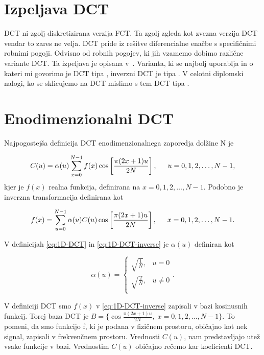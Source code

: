 \documentclass[a4paper,12pt,openright]{book}
\newcommand{\RNum}[1]{\uppercase\expandafter{\romannumeral #1\relax}}
\begin{document}
\section{Izpeljava DCT}
DCT ni zgolj diskretizirana verzija FCT. Ta zgolj zgleda kot zvezna verzija DCT vendar to zares ne velja. DCT pride iz rešitve diferencialne enačbe s specifičnimi robnimi pogoji. Odvisno od robnih pogojev, ki jih vzamemo dobimo različne variante DCT. Ta izpeljava je opisana v~\cite{britanak2010discrete}.  Varianta, ki se najbolj uporablja in o kateri mi govorimo je DCT tipa \RNum{2}, inverzni DCT je tipa \RNum{3}. V celotni diplomski nalogi, ko se sklicujemo na DCT mislimo s tem DCT tipa \RNum{2}. 

\section{Enodimenzionalni DCT}%
Najpogostejša definicija DCT enodimenzionalnega zaporedja dolžine N je %

\begin{equation}
C(u) = \alpha(u)  \sum_{x=0}^{N-1} f(x)\cos\left[\frac{\pi(2x+1)u}{2N}\right],  \indent 
u = 0,1,2,\ldots,N-1,
\label{eq:1D-DCT}
\end{equation}
kjer je $f(x)$ realna funkcija, definirana na $x = 0,1,2,\ldots,N-1$.
Podobno je inverzna transformacija definirana kot 

\begin{equation}
f(x) = \sum_{u=0}^{N-1} \alpha(u)C(u)\cos\left[\frac{\pi(2x+1)u}{2N}\right],  \indent 
x = 0,1,2,\ldots,N-1.
\label{eq:1D-DCT-inverse}
\end{equation}

V definicijah \eqref{eq:1D-DCT} in \eqref{eq:1D-DCT-inverse} je $\alpha(u)$ definiran kot 

\begin{equation}
\alpha(u)=
    \begin{cases}
          \sqrt{\frac{1}{N}}, & u=0 \\
          \sqrt{\frac{2}{N}}, & u\neq 0 \\
    \end{cases}.
\label{eq:definicija_alpha}
\end{equation}

V definiciji DCT smo $f(x)$ v \eqref{eq:1D-DCT-inverse} zapisali v bazi kosinusnih funkcij. Torej baza DCT je $B = \{\cos\frac{\pi(2x+1)u}{2N}, \; x = 0,1,2,\ldots,N-1 \}$. To pomeni, da smo funkcijo f, ki je podana v fizičnem prostoru, običajno kot nek signal, zapisali v frekvenčnem prostoru. Vrednosti $C(u)$, nam predstavljajo utež vsake funkcije v bazi. Vrednostim $C(u)$ običajno rečemo kar koeficienti DCT.
\end{document}
